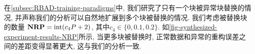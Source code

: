 
在\cref{subsec:RBAD-training-paradigms}中, 我们研究了只有一个块被异常块替换的情况, 并声称我们的分析可以自然地扩展到多个块被替换的情况.
我们考虑被替换块的数量 $\mathbf{NRP} = {\rm{int}}(c_4 P + 2)$, 其中$c_4 \in \{0, 0.1, 0.2\}$.
如\cref{fig-synthesized-experiment-results-NRP}所示, 当更多块被替换时, 正常数据和异常的重构误差之间的差距变得显著更大, 这与我们的分析一致.


